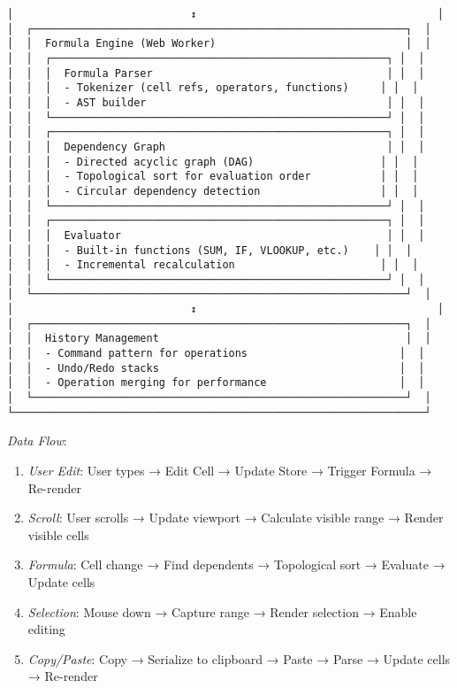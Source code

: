 \documentclass[11pt]{article}
\begin{document}
\begin{verbatim}
│                            ↕                                      │
│  ┌───────────────────────────────────────────────────────────┐  │
│  │  Formula Engine (Web Worker)                              │  │
│  │  ┌─────────────────────────────────────────────────────┐ │  │
│  │  │  Formula Parser                                     │ │  │
│  │  │  - Tokenizer (cell refs, operators, functions)     │ │  │
│  │  │  - AST builder                                      │ │  │
│  │  └─────────────────────────────────────────────────────┘ │  │
│  │  ┌─────────────────────────────────────────────────────┐ │  │
│  │  │  Dependency Graph                                   │ │  │
│  │  │  - Directed acyclic graph (DAG)                    │ │  │
│  │  │  - Topological sort for evaluation order           │ │  │
│  │  │  - Circular dependency detection                   │ │  │
│  │  └─────────────────────────────────────────────────────┘ │  │
│  │  ┌─────────────────────────────────────────────────────┐ │  │
│  │  │  Evaluator                                          │ │  │
│  │  │  - Built-in functions (SUM, IF, VLOOKUP, etc.)    │ │  │
│  │  │  - Incremental recalculation                       │ │  │
│  │  └─────────────────────────────────────────────────────┘ │  │
│  └───────────────────────────────────────────────────────────┘  │
│                            ↕                                      │
│  ┌───────────────────────────────────────────────────────────┐  │
│  │  History Management                                       │  │
│  │  - Command pattern for operations                        │  │
│  │  - Undo/Redo stacks                                      │  │
│  │  - Operation merging for performance                     │  │
│  └───────────────────────────────────────────────────────────┘  │
└─────────────────────────────────────────────────────────────────┘
\end{verbatim}

\emph{Data Flow}:

\begin{enumerate}
\item \emph{User Edit}: User types → Edit Cell → Update Store → Trigger Formula → Re-render
\item \emph{Scroll}: User scrolls → Update viewport → Calculate visible range → Render visible cells
\item \emph{Formula}: Cell change → Find dependents → Topological sort → Evaluate → Update cells
\item \emph{Selection}: Mouse down → Capture range → Render selection → Enable editing
\item \emph{Copy/Paste}: Copy → Serialize to clipboard → Paste → Parse → Update cells → Re-render
\end{enumerate}
\end{document}
